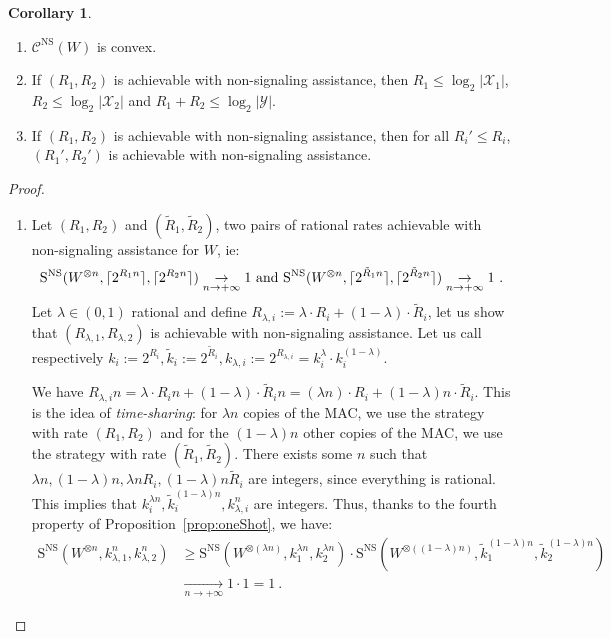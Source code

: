 \documentclass[11pt]{article}
\theoremstyle{definition}
\newtheorem{cor}[theo]{Corollary}
\theoremstyle{remark}
\DeclarePairedDelimiter\ceil{\lceil}{\rceil}
\begin{document}
\begin{cor}
  \label{cor:asymptotic}
  \begin{enumerate}
      \item $\mathcal{C}^{\mathrm{NS}}(W)$ is convex.
      \item If $(R_1,R_2)$ is achievable with non-signaling assistance, then $R_1 \leq \log_2|\mathcal{X}_1|$, $R_2 \leq \log_2|\mathcal{X}_2|$ and $R_1 + R_2 \leq \log_2|\mathcal{Y}|$.
      \item If $(R_1,R_2)$ is achievable with non-signaling assistance, then for all $R_i' \leq R_i$, $(R_1',R_2')$ is achievable with non-signaling assistance.
  \end{enumerate}
\end{cor}

\begin{proof}
  \begin{enumerate}
    \item Let $(R_1,R_2)$ and $(\tilde{R}_1,\tilde{R}_2)$, two pairs of rational rates achievable with non-signaling assistance for $W$, ie:
    \[ \mathrm{S}^{\mathrm{NS}}(W^{\otimes n},\ceil{2^{R_1n}},\ceil{2^{R_2n}}) \underset{n \rightarrow +\infty}{\rightarrow} 1 \text{ and }\mathrm{S}^{\mathrm{NS}}(W^{\otimes n},\ceil{2^{\tilde{R}_1n}},\ceil{2^{\tilde{R}_2n}}) \underset{n \rightarrow +\infty}{\rightarrow} 1 \ . \]
    Let $\lambda \in (0,1)$ rational and define $R_{\lambda,i} := \lambda \cdot R_i + (1-\lambda) \cdot \tilde{R}_i$, let us show that $(R_{\lambda,1},R_{\lambda,2})$ is achievable with non-signaling assistance. Let us call respectively $k_i:=2^{R_i}, \tilde{k}_i := 2^{\tilde{R}_i}, k_{\lambda,i} := 2^{R_{\lambda,i}} = k_i^{\lambda}\cdot k_i^{(1-\lambda)}$.

    We have $R_{\lambda,i}n = \lambda \cdot R_in + (1-\lambda) \cdot \tilde{R}_in = (\lambda n) \cdot R_i + (1-\lambda)n \cdot \tilde{R}_i$. This is the idea of \emph{time-sharing}: for $\lambda n$ copies of the MAC, we use the strategy with rate $(R_1,R_2)$ and for the $(1-\lambda)n$ other copies of the MAC, we use the strategy with rate $(\tilde{R}_1,\tilde{R}_2)$. There exists some $n$ such that $\lambda n,(1-\lambda)n,\lambda n R_i,(1-\lambda)n \tilde{R}_i$ are integers, since everything is rational. This implies that $k_i^{\lambda n},\tilde{k}_i^{(1-\lambda)n},k_{\lambda,i}^n$ are integers. Thus, thanks to the fourth property of Proposition~\ref{prop:oneShot}, we have:
    \begin{equation}
      \begin{aligned}
        \mathrm{S}^{\mathrm{NS}}(W^{\otimes n},k^n_{\lambda,1},k^n_{\lambda, 2}) &\geq \mathrm{S}^{\mathrm{NS}}(W^{\otimes (\lambda n)}, k_1^{\lambda n}, k_2^{\lambda n}) \cdot \mathrm{S}^{\mathrm{NS}}(W^{\otimes ((1-\lambda) n)}, \tilde{k}_1^{(1-\lambda) n}, \tilde{k}_2^{(1-\lambda) n})\\
        &\underset{n \rightarrow +\infty}{\rightarrow} 1 \cdot 1 = 1 \ .
      \end{aligned}
    \end{equation}


\end{enumerate}
\end{proof}
\end{document}
